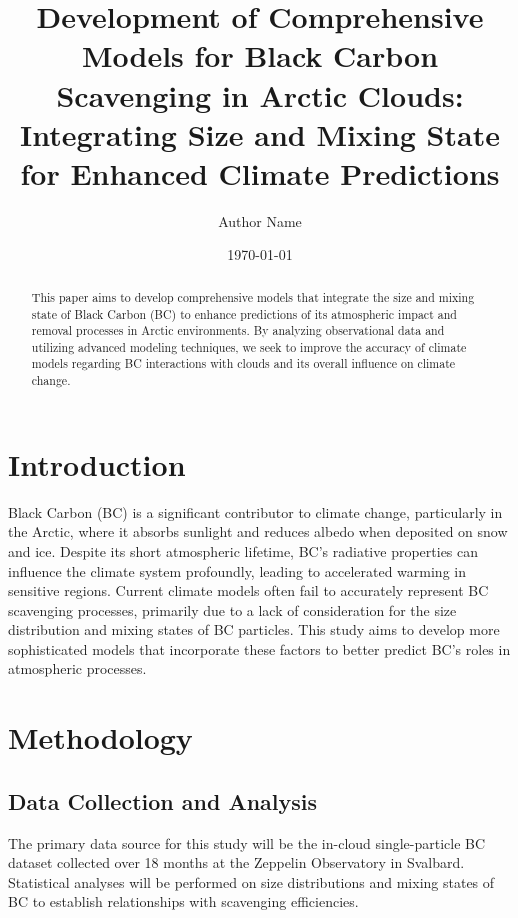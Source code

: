 \documentclass{article}
\title{Development of Comprehensive Models for Black Carbon Scavenging in Arctic Clouds: Integrating Size and Mixing State for Enhanced Climate Predictions}
\author{Author Name}
\date{\today}
\begin{document}
\maketitle

\begin{abstract}
This paper aims to develop comprehensive models that integrate the size and mixing state of Black Carbon (BC) to enhance predictions of its atmospheric impact and removal processes in Arctic environments. By analyzing observational data and utilizing advanced modeling techniques, we seek to improve the accuracy of climate models regarding BC interactions with clouds and its overall influence on climate change.
\end{abstract}

\section{Introduction}
Black Carbon (BC) is a significant contributor to climate change, particularly in the Arctic, where it absorbs sunlight and reduces albedo when deposited on snow and ice. Despite its short atmospheric lifetime, BC's radiative properties can influence the climate system profoundly, leading to accelerated warming in sensitive regions. Current climate models often fail to accurately represent BC scavenging processes, primarily due to a lack of consideration for the size distribution and mixing states of BC particles. This study aims to develop more sophisticated models that incorporate these factors to better predict BC's roles in atmospheric processes.

\section{Methodology}
\subsection{Data Collection and Analysis}
The primary data source for this study will be the in-cloud single-particle BC dataset collected over 18 months at the Zeppelin Observatory in Svalbard. Statistical analyses will be performed on size distributions and mixing states of BC to establish relationships with scavenging efficiencies.
\end{document}
